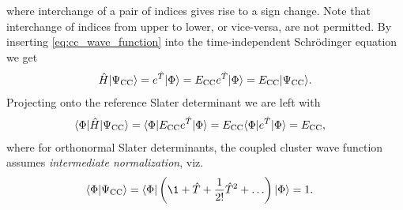         where interchange of a pair of indices gives rise to a sign change.
        Note that interchange of indices from upper to lower, or vice-versa, are
        not permitted.
        By inserting \autoref{eq:cc_wave_function} into the time-independent
        Schrödinger equation we get
        \begin{align}
            \hat{H}| \Psi_{\text{CC}} \rangle
            = e^{\hat{T}}| \Phi \rangle
            = E_{\text{CC}} e^{\hat{T}}| \Phi \rangle
            = E_{\text{CC}} | \Psi_{\text{CC}} \rangle.
        \end{align}
        Projecting onto the reference Slater determinant we are left with
        \begin{align}
            \langle \Phi |\hat{H}| \Psi_{\text{CC}} \rangle
            &= \langle \Phi |E_{\text{CC}} e^{\hat{T}}| \Phi \rangle
            = E_{\text{CC}} \langle \Phi | e^{\hat{T}}| \Phi \rangle
            = E_{\text{CC}},
        \end{align}
        where for orthonormal Slater determinants, the coupled cluster wave
        function assumes \emph{intermediate normalization}, viz.
        \begin{align}
            \braket{\slat}{\cc}
            &= \bra{\slat}\para{
                \1 + \clust + \frac{1}{2!}\clust^2 + \dots
            }\ket{\slat}
            = 1.
        \end{align}
